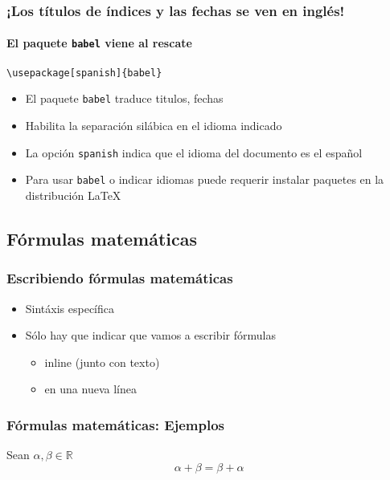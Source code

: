 \documentclass[svgnames]{beamer}
\begin{document}
\begin{frame}[fragile]
  \frametitle{¡Los títulos de índices y las fechas se ven en inglés!}
  \framesubtitle{El paquete \texttt{babel} viene al rescate}

  \begin{lstlisting}[style=latex]
\usepackage[spanish]{babel}
  \end{lstlisting}

  \begin{itemize}
    \item El paquete \texttt{babel} traduce titulos, fechas
    \item Habilita la separación silábica en el idioma indicado
    \item La opción \texttt{spanish} indica que el idioma del documento es el español
    \item Para usar \texttt{babel} o indicar idiomas puede requerir instalar paquetes en la distribución \LaTeX
  \end{itemize}
\end{frame}

\subsection{Fórmulas matemáticas}
\begin{frame}
  \frametitle{Escribiendo fórmulas matemáticas}
  \begin{itemize}
    \item Sintáxis específica
    \item Sólo hay que indicar que vamos a escribir fórmulas
    \begin{itemize}
      \item inline (junto con texto)
      \item en una nueva línea
    \end{itemize}
   \end{itemize}
\end{frame}

\begin{frame}
  \frametitle{Fórmulas matemáticas: Ejemplos}
   {}
   {Sean $ \alpha, \beta \in \mathbb{R} $\begin{equation*} \alpha + \beta = \beta + \alpha\end{equation*} }      
\end{frame}
\end{document}
